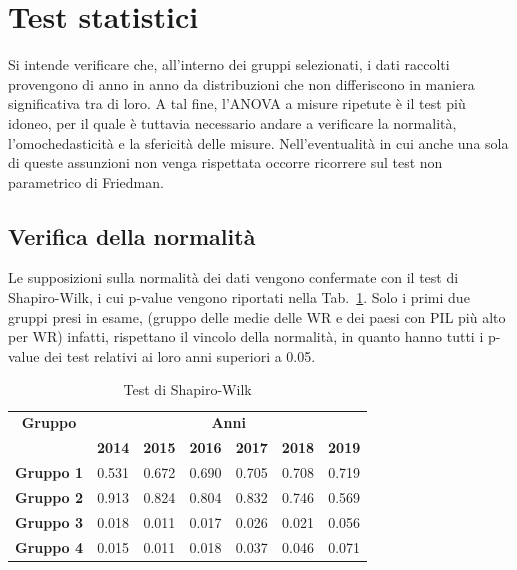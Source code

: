 \documentclass[conference]{IEEEtran}
\begin{document}
\section{Test statistici}

Si intende verificare che, all'interno dei gruppi selezionati,
i dati raccolti provengono di anno in anno da distribuzioni che non differiscono
in maniera significativa tra di loro.
A tal fine, l'ANOVA a misure ripetute è il test più idoneo,
per il quale è tuttavia necessario andare a verificare la normalità,
l'omochedasticità e la sfericità delle misure.
Nell'eventualità in cui
anche una sola di queste assunzioni non venga rispettata occorre
ricorrere sul test non parametrico di Friedman.

\subsection{Verifica della normalità}

Le supposizioni sulla normalità dei dati vengono confermate
con il test di Shapiro-Wilk, i cui p-value vengono riportati nella Tab.~\ref{tab1}.
Solo i primi due gruppi presi in esame,
(gruppo delle medie delle WR e dei paesi con PIL più alto per WR)
infatti, rispettano il vincolo della normalità,
in quanto hanno tutti i p-value dei test relativi ai loro anni superiori a 0.05.
\begin{table}[htbp]
    \caption{Test di Shapiro-Wilk}
    \begin{center}
    \begin{tabular}{|c|c|c|c|c|c|c|}
    \hline
    \textbf{Gruppo}&\multicolumn{6}{|c|}{\textbf{Anni}} \\
    \cline{2-7} 
     & \textbf{2014} & \textbf{2015} & \textbf{2016} & \textbf{2017} & \textbf{2018} & \textbf{2019}\\
    \hline
    \textbf{Gruppo 1} & 0.531 & 0.672 & 0.690 & 0.705 & 0.708 & 0.719 \\\cline{1-7}
    \textbf{Gruppo 2} & 0.913 & 0.824 & 0.804 & 0.832 & 0.746 & 0.569 \\\cline{1-7}
    \textbf{Gruppo 3} & 0.018 & 0.011 & 0.017 & 0.026 & 0.021 & 0.056 \\\cline{1-7}
    \textbf{Gruppo 4} & 0.015 & 0.011 & 0.018 & 0.037 & 0.046 & 0.071 \\\cline{1-7}
    \hline
    \end{tabular}
    \label{tab1}
    \end{center}
\end{table}
\end{document}
